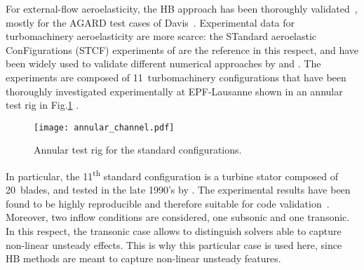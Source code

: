 
For external-flow aeroelasticity, the HB approach has 
been thoroughly validated~\cite{Gopinath2005, Woodgate2009, JDufour2009}, 
mostly for the AGARD test cases of Davis~\cite{Davis1982}.
Experimental data for turbomachinery aeroelasticity are more scarce: 
the STandard aeroelastic ConFigurations (STCF) experiments 
of \citet{Fransson1999} are the 
reference in this respect, and have been widely used 
to validate different numerical approaches by \citet{Sbardella2001,
Duta2002,Campobasso2003} and \citet{Cinnella2004}. The experiments
are composed of 11~turbomachinery configurations that have been
thoroughly  investigated experimentally at EPF-Lausanne shown in an 
annular test rig in Fig.\ref{fig:annular_channel} .
\begin{figure}[htbp]
  \centering
  \texttt{[image: annular\_channel.pdf]}
  \caption{Annular test rig for the standard configurations.}
  \label{fig:annular_channel}
\end{figure}

In particular, the 11\textsuperscript{th} standard configuration is a
turbine stator composed of 20~blades, and tested
in the late 1990's by \citet{Fransson1999}.
The experimental results have been found to be highly reproducible and
therefore suitable for code validation~\cite{Fransson1999}.  Moreover,
two inflow conditions are considered, one subsonic and one transonic.
In this respect, the transonic case allows to distinguish
solvers able to capture non-linear unsteady effects. This is why this particular
case is used here, since HB methods are meant to capture non-linear unsteady
features.

